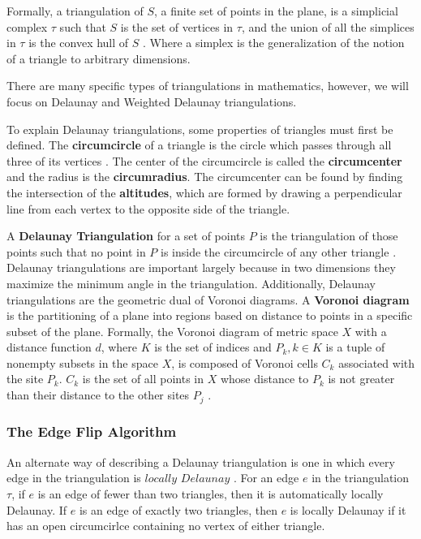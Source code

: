\documentclass[11pt]{article}
\begin{document}
Formally, a triangulation of $S$, a finite set of points in the plane, is a simplicial complex $\tau$ such that $S$ is the set of vertices in $\tau$, and the union of all the simplices in $\tau$ is the convex hull of $S$ \cite{meshGeneration}. Where a simplex is the generalization of the notion of a triangle to arbitrary dimensions.

There are many specific types of triangulations in mathematics, however, we will focus on Delaunay and Weighted Delaunay triangulations.

To explain Delaunay triangulations, some properties of triangles must first be defined. The \textbf{circumcircle} of a triangle is the circle which passes through all three of its vertices \cite{mathworld:Circumcenter}. The center of the circumcircle is called the \textbf{circumcenter} and the radius is the \textbf{circumradius}. The circumcenter can be found by finding the intersection of the \textbf{altitudes}, which are formed by drawing a perpendicular line from each vertex to the opposite side of the triangle.
  
A \textbf{Delaunay Triangulation} for a set of points $P$ is the triangulation of those points such that no point in $P$ is inside the circumcircle of any other triangle \cite{meshGeneration}. Delaunay triangulations are important largely because in two dimensions they maximize the minimum angle in the triangulation. Additionally, Delaunay triangulations are the geometric dual of Voronoi diagrams. A \textbf{Voronoi diagram} is the partitioning of a plane into regions based on distance to points in a specific subset of the plane. Formally, the Voronoi diagram of metric space $X$ with a distance function $d$, where $K$ is the set of indices and $P_k, k \in K$ is a tuple of nonempty subsets in the space $X$, is composed of Voronoi cells $C_k$ associated with the site $P_k$. $C_k$ is the set of all points in $X$ whose distance to $P_k$ is not greater than their distance to the other sites $P_j$ \cite{voronoiDiagrams}. 

\subsubsection{The Edge Flip Algorithm}
An alternate way of describing a Delaunay triangulation is one in which every edge in the triangulation is $locally$ $Delaunay$ \cite{meshGeneration}. For an edge $e$ in the triangulation $\tau$, if $e$ is an edge of fewer than two triangles, then it is automatically locally Delaunay. If $e$ is an edge of exactly two triangles, then $e$ is locally Delaunay if it has an open circumcirlce containing no vertex of either triangle. 
\end{document}
